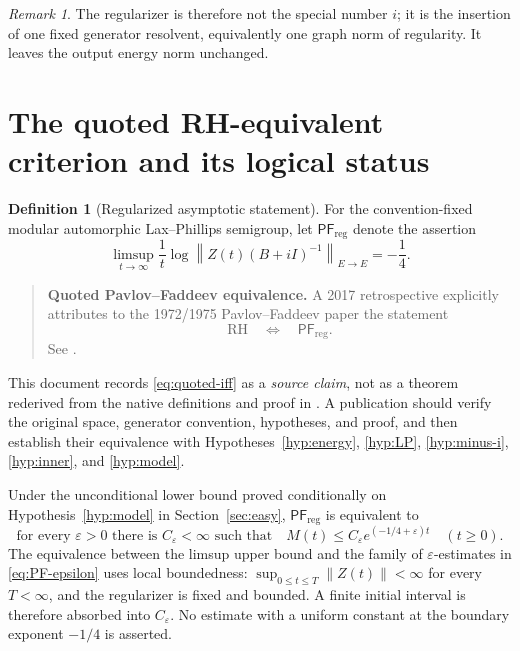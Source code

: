 \documentclass[11pt]{amsart}
\theoremstyle{definition}
\newtheorem{definition}[theorem]{Definition}
\theoremstyle{remark}
\newtheorem{remark}[theorem]{Remark}
\newcommand{\norm}[1]{\left\lVert #1\right\rVert}
\newcommand{\eps}{\varepsilon}
\begin{document}
\begin{remark}
The regularizer is therefore not the special number $i$; it is the insertion
of one fixed generator resolvent, equivalently one graph norm of regularity.
It leaves the output energy norm unchanged.
\end{remark}

\section{The quoted RH-equivalent criterion and its logical status}
\label{sec:criterion}

\begin{definition}[Regularized asymptotic statement]\label{def:PF}
For the convention-fixed modular automorphic Lax--Phillips semigroup, let
$\mathsf{PF}_{\mathrm{reg}}$ denote the assertion
\begin{equation}\label{eq:PF-criterion}
 \boxed{\quad
 \limsup_{t\to\infty}\frac1t
 \log\norm{Z(t)(B+iI)^{-1}}_{E\to E}
 =-\frac14.
 \quad}
\end{equation}
\end{definition}

\begin{quote}
\textbf{Quoted Pavlov--Faddeev equivalence.}
A 2017 retrospective explicitly attributes to the 1972/1975
Pavlov--Faddeev paper the statement
\begin{equation}\label{eq:quoted-iff}
 \boxed{\qquad \mathrm{RH}\quad\Longleftrightarrow\quad
 \mathsf{PF}_{\mathrm{reg}}.\qquad}
\end{equation}
See \cite[\S3.2, formula (3.6), p.~1004]{TakhtajanEtAl2017}.
\end{quote}

This document records \eqref{eq:quoted-iff} as a \emph{source claim}, not as a
theorem rederived from the native definitions and proof in
\cite{PavlovFaddeev1975}.  A publication should verify the original
space, generator convention, hypotheses, and proof, and then establish their
equivalence with Hypotheses~\ref{hyp:energy}, \ref{hyp:LP},
\ref{hyp:minus-i}, \ref{hyp:inner}, and \ref{hyp:model}.

Under the unconditional lower bound proved conditionally on
Hypothesis~\ref{hyp:model} in Section~\ref{sec:easy},
$\mathsf{PF}_{\mathrm{reg}}$ is equivalent to
\begin{equation}\label{eq:PF-epsilon}
 \text{for every $\eps>0$ there is $C_{\eps}<\infty$ such that}
 \quad
 M(t)\leq C_{\eps}e^{(-1/4+\eps)t}
 \quad(t\geq0).
\end{equation}
The equivalence between the limsup upper bound and the family of
$\eps$-estimates in \eqref{eq:PF-epsilon} uses local boundedness:
$\sup_{0\leq t\leq T}\norm{Z(t)}<\infty$ for every $T<\infty$, and the
regularizer is fixed and bounded.  A finite initial interval is therefore
absorbed into $C_{\eps}$.  No estimate with a uniform constant at the boundary
exponent $-1/4$ is asserted.
\end{document}
